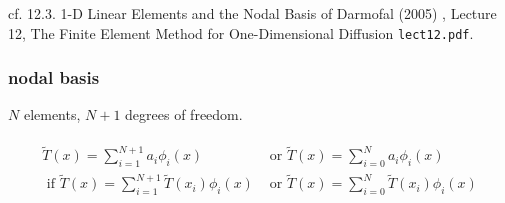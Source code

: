 \documentclass[10pt]{amsart}
\begin{document}
\begin{multicols*}{2}
cf. 12.3. 1-D Linear Elements and the Nodal Basis of Darmofal (2005) \cite{Darm2005}, Lecture 12, The Finite Element Method for One-Dimensional Diffusion \verb|lect12.pdf|.

\subsubsection{nodal basis}

$N$ elements, $N+1$ degrees of freedom.

\[
\begin{gathered}
  \begin{aligned}
    \widetilde{T}(x) = \sum_{i=1}^{N+1} a_i \phi_i(x) & \text{ or } \widetilde{T}(x) = \sum_{i=0}^N a_i \phi_i(x) \\ 
 \text{ if } \widetilde{T}(x) = \sum_{i=1}^{N+1} \widetilde{T}(x_i) \phi_i(x) & \text{ or } \widetilde{T}(x) = \sum_{i=0}^N \widetilde{T}(x_i) \phi_i(x)
\end{aligned}
\end{gathered}
\]


\end{multicols*}
\end{document}
